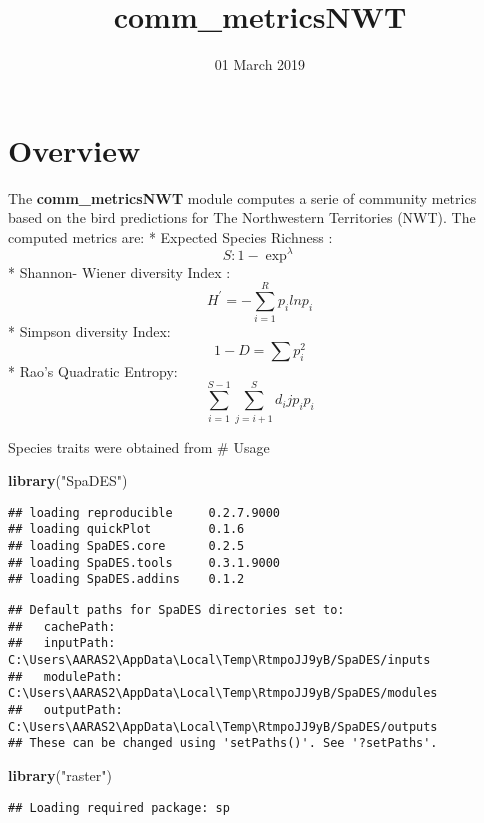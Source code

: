 \documentclass[]{article}
\title{comm\_metricsNWT}
\author{}
\date{01 March 2019}
\newenvironment{Shaded}{\begin{snugshade}}{\end{snugshade}}
\newcommand{\KeywordTok}[1]{\textcolor[rgb]{0.13,0.29,0.53}{\textbf{#1}}}
\newcommand{\StringTok}[1]{\textcolor[rgb]{0.31,0.60,0.02}{#1}}
\newcommand{\NormalTok}[1]{#1}
\begin{document}
\maketitle

\section{Overview}\label{overview}

The \textbf{comm\_metricsNWT} module computes a serie of community
metrics based on the bird predictions for The Northwestern Territories
(NWT). The computed metrics are: * Expected Species Richness :
\[S: 1 - \exp^{\lambda}\] * Shannon- Wiener diversity Index :
\[ H^' = - \sum_{i=1}^{R} p_ilnp_i \] * Simpson diversity Index:
\[ 1-D = \sum p_i^2 \] * Rao's Quadratic Entropy:
\[ \sum_{i=1}^{S-1} \sum_{j=i+1}^{S} d_ijp_ip_i\]

Species traits were obtained from \# Usage

\begin{Shaded}
\begin{Highlighting}[]
\KeywordTok{library}\NormalTok{(}\StringTok{"SpaDES"}\NormalTok{)}
\end{Highlighting}
\end{Shaded}

\begin{verbatim}
## loading reproducible     0.2.7.9000
## loading quickPlot        0.1.6
## loading SpaDES.core      0.2.5
## loading SpaDES.tools     0.3.1.9000
## loading SpaDES.addins    0.1.2
\end{verbatim}

\begin{verbatim}
## Default paths for SpaDES directories set to:
##   cachePath:  
##   inputPath:  C:\Users\AARAS2\AppData\Local\Temp\RtmpoJJ9yB/SpaDES/inputs
##   modulePath: C:\Users\AARAS2\AppData\Local\Temp\RtmpoJJ9yB/SpaDES/modules
##   outputPath: C:\Users\AARAS2\AppData\Local\Temp\RtmpoJJ9yB/SpaDES/outputs
## These can be changed using 'setPaths()'. See '?setPaths'.
\end{verbatim}

\begin{Shaded}
\begin{Highlighting}[]
\KeywordTok{library}\NormalTok{(}\StringTok{"raster"}\NormalTok{)}
\end{Highlighting}
\end{Shaded}

\begin{verbatim}
## Loading required package: sp
\end{verbatim}
\end{document}
